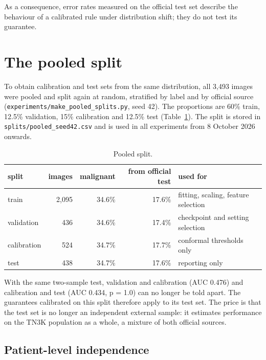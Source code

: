 As a consequence, error rates measured on the official test set describe the behaviour of a
calibrated rule under distribution shift; they do not test its guarantee.

\section{The pooled split}
\label{sec:data-pooled}

To obtain calibration and test sets from the same distribution, all 3,493 images were pooled and
split again at random, stratified by label and by official source
(\texttt{experiments/make\_pooled\_splits.py}, seed 42). The proportions are 60\% train, 12.5\%
validation, 15\% calibration and 12.5\% test (Table~\ref{tab:data-pooled}). The split is stored
in \texttt{splits/pooled\_seed42.csv} and is used in all experiments from 8 October 2026 onwards.

\begin{table}[ht]
  \centering
  \small
  \caption{Pooled split.}
  \label{tab:data-pooled}
  \begin{tabular}{lrrr>{\raggedright\arraybackslash}p{4.2cm}}
    \toprule
    split & images & malignant & from official test & used for \\
    \midrule
    train       & 2,095 & 34.6\% & 17.6\% & fitting, scaling, feature selection \\
    validation  &   436 & 34.6\% & 17.4\% & checkpoint and setting selection \\
    calibration &   524 & 34.7\% & 17.7\% & conformal thresholds only \\
    test        &   438 & 34.7\% & 17.6\% & reporting only \\
    \bottomrule
  \end{tabular}
\end{table}

With the same two-sample test, validation and calibration (AUC 0.476) and calibration and test
(AUC 0.434, p = 1.0) can no longer be told apart. The guarantees calibrated on this split
therefore apply to its test set. The price is that the test set is no longer an independent
external sample: it estimates performance on the TN3K population as a whole, a mixture of both
official sources.

\subsection{Patient-level independence}
\label{sec:data-patients}

